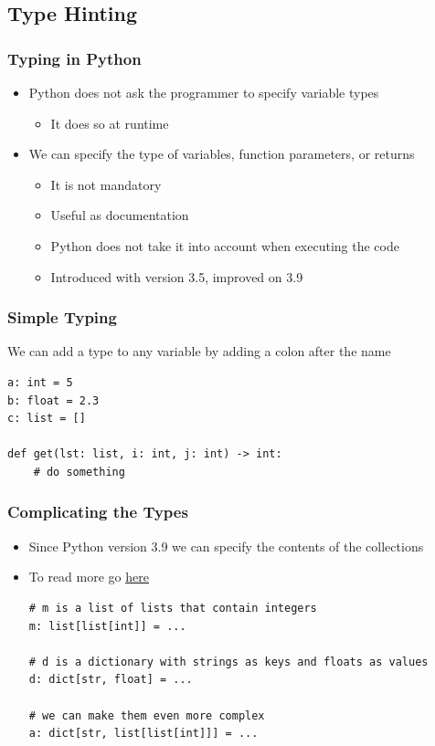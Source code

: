 \documentclass[11pt]{beamer}
\begin{document}
\subsection{Type Hinting}

\begin{frame}\frametitle{Typing in Python}
\begin{itemize}
\item Python does not ask the programmer to specify variable types
    \begin{itemize}
    \item It does so at runtime
    \end{itemize}
\item We can specify the type of variables, function parameters, or returns
    \begin{itemize}
    \item It is not mandatory
    \item Useful as documentation
    \item Python does not take it into account when executing the code
    \item Introduced with version 3.5, improved on 3.9
    \end{itemize}
\end{itemize}
\end{frame}

\begin{frame}[fragile]\frametitle{Simple Typing}
\begin{block}{}
\centering We can add a type to any variable by adding a colon after the name
\end{block}
\begin{lstlisting}
a: int = 5
b: float = 2.3
c: list = []

def get(lst: list, i: int, j: int) -> int:
    # do something
\end{lstlisting}
\end{frame}

\begin{frame}[fragile]\frametitle{Complicating the Types}
\begin{itemize}
\item Since Python version 3.9 we can specify the contents of the collections
\item To read more go \href{https://mypy.readthedocs.io/en/stable/cheat_sheet_py3.html}{\color{blue}\underline{here}}
\begin{lstlisting}
# m is a list of lists that contain integers
m: list[list[int]] = ...

# d is a dictionary with strings as keys and floats as values
d: dict[str, float] = ...

# we can make them even more complex
a: dict[str, list[list[int]]] = ...
\end{lstlisting}
\end{itemize}
\end{frame}
\end{document}
